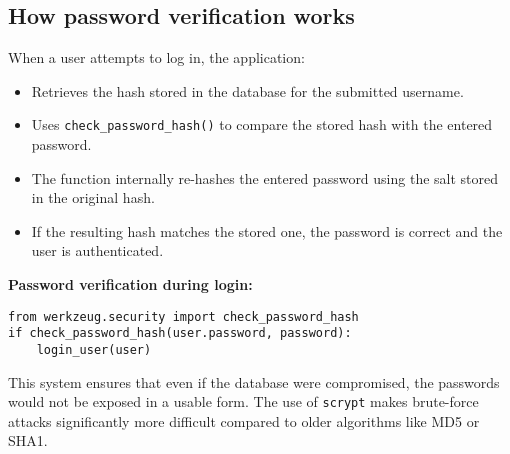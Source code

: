 \documentclass[12pt]{article}
\begin{document}
\subsection*{How password verification works}

When a user attempts to log in, the application:
\begin{itemize}
  \item Retrieves the hash stored in the database for the submitted username.
  \item Uses \texttt{check\_password\_hash()} to compare the stored hash with the entered password.
  \item The function internally re-hashes the entered password using the salt stored in the original hash.
  \item If the resulting hash matches the stored one, the password is correct and the user is authenticated.
\end{itemize}

\noindent \textbf{Password verification during login:}
\begin{verbatim}
from werkzeug.security import check_password_hash
if check_password_hash(user.password, password):
    login_user(user)
\end{verbatim}

This system ensures that even if the database were compromised, the passwords would not be exposed in a usable form. The use of \texttt{scrypt} makes brute-force attacks significantly more difficult compared to older algorithms like MD5 or SHA1.
\end{document}
